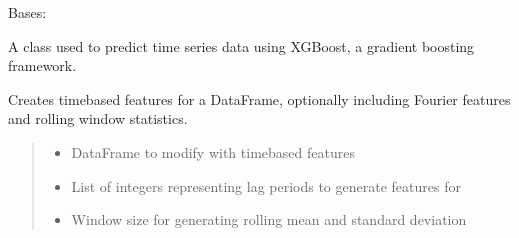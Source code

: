 \documentclass[letterpaper,10pt,english]{sphinxmanual}
\begin{document}
\begin{fulllineitems}
\label{\detokenize{docs/XGB_model:XGB_model.XGB_Predictor}}
\pysigstartsignatures
{}
\pysigstopsignatures
\sphinxAtStartPar
Bases: 

\sphinxAtStartPar
A class used to predict time series data using XGBoost, a gradient boosting framework.

\begin{fulllineitems}
\label{\detokenize{docs/XGB_model:XGB_model.XGB_Predictor.create_time_features}}
\pysigstartsignatures
{}
\pysigstopsignatures
\sphinxAtStartPar
Creates time\sphinxhyphen{}based features for a DataFrame, optionally including Fourier features and rolling window statistics.
\begin{quote}\begin{description}
\begin{itemize}
\item {} 
\sphinxAtStartPar
{} \textendash{} DataFrame to modify with time\sphinxhyphen{}based features

\item {} 
\sphinxAtStartPar
{} \textendash{} List of integers representing lag periods to generate features for

\item {} 
\sphinxAtStartPar
{} \textendash{} Window size for generating rolling mean and standard deviation


\end{itemize}
\end{description}
\end{quote}
\end{fulllineitems}
\end{fulllineitems}
\end{document}
